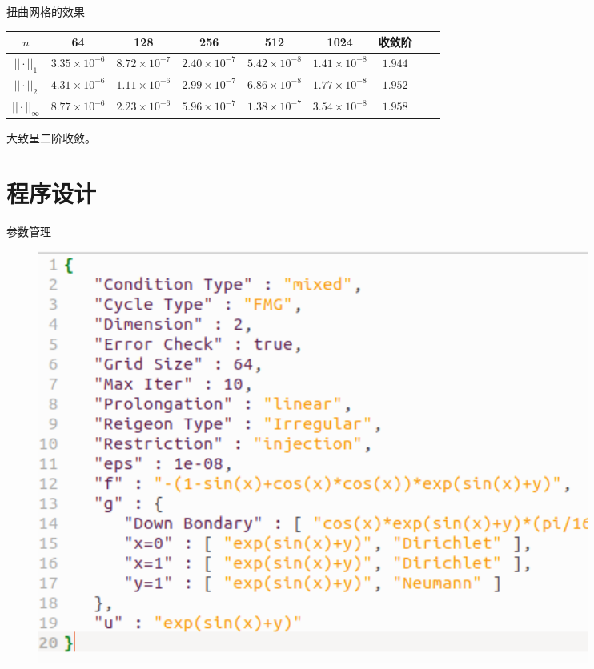 \documentclass[9pt]{beamer}
\begin{document}
\begin{frame}{扭曲网格的效果}
\begin{table}
  \centering
  \tiny
  \begin{tabular}{c|ccccccc|c}
  \textbf{$n$}       & 64                   & 128                  & 256                  & 512                  & 1024                  & 收敛阶 \\ \hline
  $||\cdot||_1$      & $3.35\times 10^{-6}$ & $8.72\times 10^{-7}$ & $2.40\times 10^{-7}$ & $5.42\times 10^{-8}$ & $1.41\times 10^{-8}$ & $1.944$\\
  $||\cdot||_2$      & $4.31\times 10^{-6}$ & $1.11\times 10^{-6}$ & $2.99\times 10^{-7}$ & $6.86\times 10^{-8}$ & $1.77\times 10^{-8}$ & $1.952$\\
  $||\cdot||_\infty$ & $8.77\times 10^{-6}$ & $2.23\times 10^{-6}$ & $5.96\times 10^{-7}$ & $1.38\times 10^{-7}$ & $3.54\times 10^{-8}$ & $1.958$
  \end{tabular}
\end{table}

大致呈二阶收敛。
\end{frame}

\section{程序设计}

\begin{frame}{参数管理}
\small
\begin{figure}[H]
\centering
\includegraphics[width=0.88\textwidth]{pic/parm.png}
\end{figure}
\end{frame}
\end{document}
